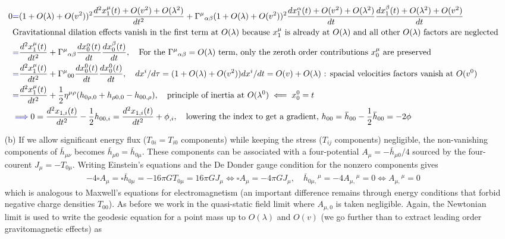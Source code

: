 \documentclass[10pt, a4paper]{article}
\begin{document}
\begin{enumerate}
  \begin{align*}
    0
    &\textcolor{blue}{=} (1 + O(\lambda) + O(v^2))^2 \frac{d^2 x_1^{\mu}(t) + O(v^2) + O(\lambda^2)}{dt^2} + \Gamma^{\mu}{}_{\alpha \beta} (1 + O(\lambda) + O(v^2))^2\frac{dx_1^\alpha(t) + O(v^2) + O(\lambda^2)}{dt} \frac{dx_1^\beta(t)+O(\lambda^2) + O(v^2)}{dt}\\
    &\text{Gravitationnal dilation effects vanish in the first term at $O(\lambda)$ because $x_1^{\mu}$ is already at $O(\lambda)$ and all other $O(\lambda)$ factors are neglected}\\
    &\textcolor{blue}{=} \frac{d^2 x_1^{\mu}(t)}{dt^2} + \Gamma^{\mu}{}_{\alpha \beta} \frac{dx_0^\alpha(t)}{dt} \frac{dx_0^\beta(t)}{dt}, \quad \text{For the $\Gamma^{\mu}{}_{\alpha \beta} = O(\lambda)$ term, only the zeroth order contributions $x_0^\mu$ are preserved}\\
    &\textcolor{blue}{=} \frac{d^2 x_1^{\mu}(t)}{dt^2} + \Gamma^{\mu}{}_{00} \frac{dx_0^0(t)}{dt} \frac{dx_0^0(t)}{dt}, \quad \text{$dx^i/d\tau = (1 + O(\lambda) + O(v^2))dx^i/dt = O(v) + O(\lambda)$ : spacial velocities factors vanish at $O(v^0)$}\\
    &\textcolor{blue}{=} \frac{d^2 x_1^{\mu}(t)}{dt^2} + \dfrac{1}{2}\eta^{\mu \rho}(h_{0 \rho, 0}+h_{\rho 0, 0}-h_{0 0, \rho}), \quad \text{principle of inertia at $O(\lambda^0) \impliedby x_0^0 = t$}\\
    &\textcolor{blue}{\implies} 0 = \frac{d^2 x_{1, i}(t)}{dt^2} - \dfrac{1}{2}h_{0 0,i} = \frac{d^2 x_{1, i}(t)}{dt^2} + \phi_{,i},\quad \text{lowering the index to get a gradient, $h_{00} = \bar{h}_{00} - \frac{1}{2}\bar{h}_{00} = -2\phi$}
  \end{align*}
  \item[(b)] If we allow significant energy flux ($T_{0i} = T_{i0}$ components) while keeping the stress ($T_{ij}$ components) negligible, the non-vanishing components of $\bar{h}_{\mu\nu}$ becomes $\bar{h}_{\mu0} = \bar{h}_{0\mu}$. These components can be associated with a four-potential $A_\mu = -\bar{h}_{\mu 0}/4$ sourced by the four-courent $J_\mu = -T_{0\mu}$. Writing Einstein's equations and the De Donder gauge condition for the nonzero components gives 
  \begin{align*}
  -4\square A_{\mu} = \square\bar{h}_{0\mu} = -16\pi G T_{0\mu} = 16\pi G J_{\mu} \iff \square A_{\mu} = -4\pi G J_{\mu}, \quad \bar{h}{}_{0\mu,}{}^{\mu} = -4A_{\mu,}{}^{\mu} = 0 \iff A_{\mu,}{}^{\mu} = 0
  \end{align*}
  which is analogous to Maxwell's equations for electromagnetism (an important difference remains through energy conditions that forbid negative charge densities $T_{00}$). As before we work in the quasi-static field limit where $A_{\mu, 0}$ is taken negligible. Again, the Newtonian limit is used to write the geodesic equation for a point mass up to $O(\lambda)$ and $O(v)$ (we go further than to extract leading order gravitomagnetic effects) as 

\end{enumerate}
\end{document}
